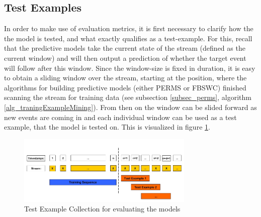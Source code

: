 \subsection{Test Examples}
In order to make use of evaluation metrics, it is first necessary to clarify how the the model is tested, and what exactly qualifies as a test-example. For this, recall that the predictive models take the current state of the stream (defined as the current window) and will then output a prediction of whether the target event will follow after this window. Since the window-size is fixed in duration, it is easy to obtain a sliding window over the stream, starting at the position, where the algorithms for building predictive models (either PERMS or FBSWC) finished scanning the stream for training data (see subsection \ref{subsec_perms}, algorithm \ref{alg_traningExampleMining}). From then on the window can be slided forward as new events are coming in and each individual window can be used as a test example, that the model is tested on. This is visualized in figure \ref{fig_testData}.

\begin{figure}[h]
	\centering
  	\includegraphics[width=0.75\textwidth]{testData}
	\caption{Test Example Collection for evaluating the models}
	\label{fig_testData}
\end{figure}


